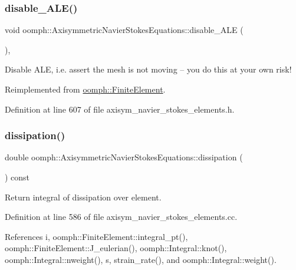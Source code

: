 \subsubsection{\texorpdfstring{disable\+\_\+\+A\+L\+E()}{disable\_ALE()}}
{\footnotesize\ttfamily void oomph\+::\+Axisymmetric\+Navier\+Stokes\+Equations\+::disable\+\_\+\+A\+LE (\begin{DoxyParamCaption}{ }\end{DoxyParamCaption})\hspace{0.3cm}{\ttfamily [inline]}, {\ttfamily [virtual]}}



Disable A\+LE, i.\+e. assert the mesh is not moving -- you do this at your own risk! 



Reimplemented from \hyperlink{classoomph_1_1FiniteElement_a625ea6d3f9baccfbdd1323315fb3ec71}{oomph\+::\+Finite\+Element}.



Definition at line 607 of file axisym\+\_\+navier\+\_\+stokes\+\_\+elements.\+h.

\mbox{\label{classoomph_1_1AxisymmetricNavierStokesEquations_a002f84742337fbf2dcba83866b1d089e}} 
\subsubsection{\texorpdfstring{dissipation()}{dissipation()}\hspace{0.1cm}{\footnotesize\ttfamily [1/2]}}
{\footnotesize\ttfamily double oomph\+::\+Axisymmetric\+Navier\+Stokes\+Equations\+::dissipation (\begin{DoxyParamCaption}{ }\end{DoxyParamCaption}) const}



Return integral of dissipation over element. 



Definition at line 586 of file axisym\+\_\+navier\+\_\+stokes\+\_\+elements.\+cc.



References i, oomph\+::\+Finite\+Element\+::integral\+\_\+pt(), oomph\+::\+Finite\+Element\+::\+J\+\_\+eulerian(), oomph\+::\+Integral\+::knot(), oomph\+::\+Integral\+::nweight(), s, strain\+\_\+rate(), and oomph\+::\+Integral\+::weight().



